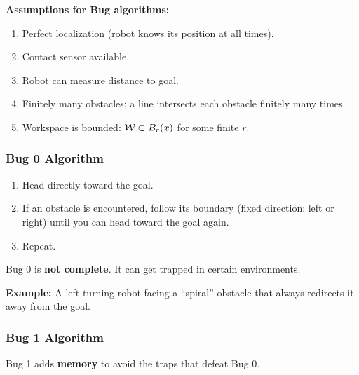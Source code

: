 \textbf{Assumptions for Bug algorithms:}
\begin{enumerate}
  \item Perfect localization (robot knows its position at all times).
  \item Contact sensor available.
  \item Robot can measure distance to goal.
  \item Finitely many obstacles; a line intersects each obstacle finitely many times.
  \item Workspace is bounded: $\mathcal{W} \subset B_r(x)$ for some finite $r$.
\end{enumerate}

\separator

\subsubsection{Bug 0 Algorithm}

\begin{thmbox}
\begin{enumerate}
  \item Head directly toward the goal.
  \item If an obstacle is encountered, follow its boundary (fixed direction: left or right) until you can head toward the goal again.
  \item Repeat.
\end{enumerate}
\end{thmbox}

\begin{tipbox}
Bug 0 is \textbf{not complete}. It can get trapped in certain environments.

\textbf{Example:} A left-turning robot facing a ``spiral'' obstacle that always redirects it away from the goal.
\end{tipbox}

\separator

\subsubsection{Bug 1 Algorithm}

Bug 1 adds \textbf{memory} to avoid the traps that defeat Bug 0.

